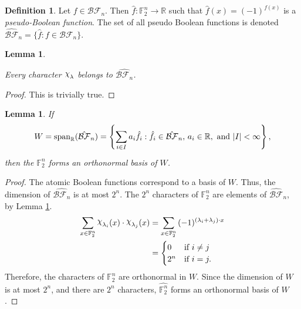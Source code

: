 \documentclass[english]{article}
\def\rrr{\mathbb{R}}
\def\gftwo{\mathbb{F}_2}
\def\BF{\mathcal{BF}}
\def\Chi{\raisebox{2pt}{$\chi$}}
\theoremstyle{plain}
\newtheorem{lemma}[theorem]{Lemma}%
\theoremstyle{definition}
\newtheorem{definition}[theorem]{Definition}%
\theoremstyle{remark}
\begin{document}
\begin{definition}\label{def:pBF}
  Let $f\in\BF_n$. Then $\hat{f}:\gftwo^n\rightarrow\rrr$ such that
  $\hat{f}(x)=(-1)^{f(x)}$ is a \textit{pseudo-Boolean function}. The set of all
  pseudo Boolean functions is denoted $\hat{\BF}_n=\{\hat{f}:f\in\BF_n\}$.
\end{definition}
\begin{lemma}\label{lem:characters}
\par Every character $\Chi_\lambda$ belongs to $\hat{\BF_n}$.
\end{lemma}
\begin{proof}
  \par This is trivially true.
\end{proof}
\begin{lemma}
  If \[W={\rm span}_\rrr(\hat{\BF}_n)=\left\{\sum_{i\in I}a_i\hat{f}_i:
  \hat{f}_i\in\hat{\BF}_n{\rm ,\ }a_i\in\rrr{\rm ,\ and\ }|I|<\infty\right\},\]
  then the $\hat{\gftwo^n}$ forms an orthonormal basis of $W$.
\end{lemma}
\begin{proof}
  The atomic Boolean functions correspond to a basis of $W$. Thus, the dimension
  of $\hat{\BF_n}$ is at most $2^n$. The $2^n$ characters of $\gftwo^n$
  are elements of $\hat{\BF}_n$, by Lemma \ref{lem:characters}.
  \begin{align*}
    \sum_{x\in\gftwo^n}{\Chi_{\lambda_i}(x)\cdot\Chi_{\lambda_j}(x)}
    &=\sum_{x\in\gftwo^n}
      {(-1)^{(\lambda_i+\lambda_j)\cdot x}}\\
    &=\begin{cases}
      0 & \text{if } i\not=j \\
      2^n & \text{if } i=j.
    \end{cases}
  \end{align*}
  Therefore, the characters of $\gftwo^n$ are orthonormal in $W$. Since the
  dimension of $W$ is at most $2^n$, and there are $2^n$ characters,
  $\hat{\gftwo^n}$ forms an orthonormal basis of $W$.
\end{proof}

\end{document}
